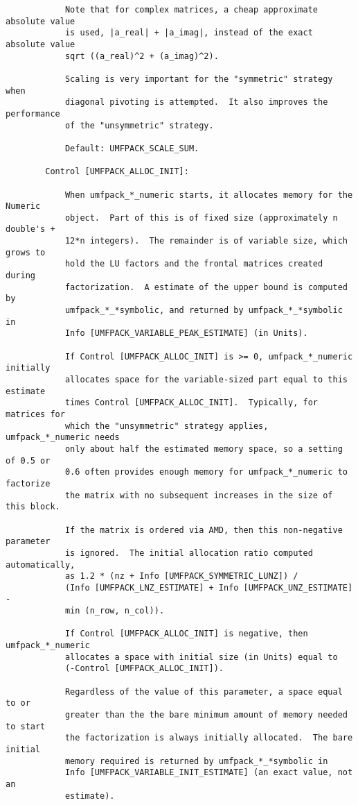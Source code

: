\documentclass[11pt]{article}
\begin{document}
{\begin{verbatim}
            Note that for complex matrices, a cheap approximate absolute value
            is used, |a_real| + |a_imag|, instead of the exact absolute value
            sqrt ((a_real)^2 + (a_imag)^2).

            Scaling is very important for the "symmetric" strategy when
            diagonal pivoting is attempted.  It also improves the performance
            of the "unsymmetric" strategy.

            Default: UMFPACK_SCALE_SUM.

        Control [UMFPACK_ALLOC_INIT]:

            When umfpack_*_numeric starts, it allocates memory for the Numeric
            object.  Part of this is of fixed size (approximately n double's +
            12*n integers).  The remainder is of variable size, which grows to
            hold the LU factors and the frontal matrices created during
            factorization.  A estimate of the upper bound is computed by
            umfpack_*_*symbolic, and returned by umfpack_*_*symbolic in
            Info [UMFPACK_VARIABLE_PEAK_ESTIMATE] (in Units).

            If Control [UMFPACK_ALLOC_INIT] is >= 0, umfpack_*_numeric initially
            allocates space for the variable-sized part equal to this estimate
            times Control [UMFPACK_ALLOC_INIT].  Typically, for matrices for
            which the "unsymmetric" strategy applies, umfpack_*_numeric needs
            only about half the estimated memory space, so a setting of 0.5 or
            0.6 often provides enough memory for umfpack_*_numeric to factorize
            the matrix with no subsequent increases in the size of this block.

            If the matrix is ordered via AMD, then this non-negative parameter
            is ignored.  The initial allocation ratio computed automatically,
            as 1.2 * (nz + Info [UMFPACK_SYMMETRIC_LUNZ]) /
            (Info [UMFPACK_LNZ_ESTIMATE] + Info [UMFPACK_UNZ_ESTIMATE] -
            min (n_row, n_col)).

            If Control [UMFPACK_ALLOC_INIT] is negative, then umfpack_*_numeric
            allocates a space with initial size (in Units) equal to
            (-Control [UMFPACK_ALLOC_INIT]).

            Regardless of the value of this parameter, a space equal to or
            greater than the the bare minimum amount of memory needed to start
            the factorization is always initially allocated.  The bare initial
            memory required is returned by umfpack_*_*symbolic in
            Info [UMFPACK_VARIABLE_INIT_ESTIMATE] (an exact value, not an
            estimate).


\end{verbatim}}
\end{document}
